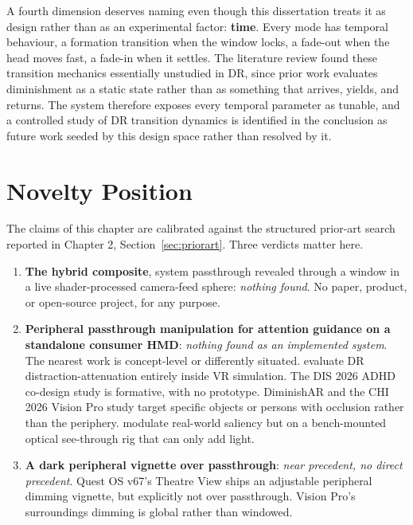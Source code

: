 A fourth dimension deserves naming even though this dissertation treats it as design rather than as
an experimental factor: \textbf{time}. Every mode has temporal behaviour, a formation transition when
the window locks, a fade-out when the head moves fast, a fade-in when it settles. The literature
review found these transition mechanics essentially unstudied in DR, since prior work evaluates
diminishment as a static state rather than as something that arrives, yields, and returns. The system
therefore exposes every temporal parameter as tunable, and a controlled study of DR transition
dynamics is identified in the conclusion as future work seeded by this design space rather than
resolved by it.

\section{Novelty Position}
\label{sec:novelty}

The claims of this chapter are calibrated against the structured prior-art search reported in
Chapter 2, Section~\ref{sec:priorart}. Three verdicts matter here.

\begin{enumerate}
\item \textbf{The hybrid composite}, system passthrough revealed through a window in a live
shader-processed camera-feed sphere: \textit{nothing found}. No paper, product, or open-source
project, for any purpose.
\item \textbf{Peripheral passthrough manipulation for attention guidance on a standalone consumer
HMD}: \textit{nothing found as an implemented system}. The nearest work is concept-level or
differently situated. \citet{mclaughlin2025} evaluate DR distraction-attenuation entirely inside VR
simulation. The DIS 2026 ADHD co-design study is formative, with no prototype. DiminishAR and the
CHI 2026 Vision Pro study target specific objects or persons with occlusion rather than the
periphery. \citet{sutton2022} modulate real-world saliency but on a bench-mounted optical see-through
rig that can only add light.
\item \textbf{A dark peripheral vignette over passthrough}: \textit{near precedent, no direct
precedent}. Quest OS v67's Theatre View ships an adjustable peripheral dimming vignette, but
explicitly not over passthrough. Vision Pro's surroundings dimming is global rather than windowed.
\end{enumerate}

